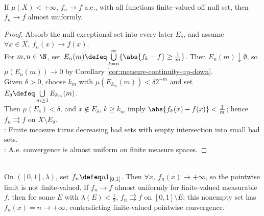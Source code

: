 \begin{theorem} \label{thm:egoroff-finite-measure} \\
If $\mu(X)<+\infty$, $f_n\to f$ a.e., with all functions finite-valued off null set, then $f_n\to f$ almost uniformly.
\begin{proof}
Absorb the null exceptional set into every later $E_\delta$, and assume $\forall x\in X,\ f_n(x)\to f(x)$.\\
For $m,n\in\N$, set $E_n(m)\defeq\bigcup\limits_{k=n}^{\infty}\{\abs{f_k-f}\geq\frac{1}{m}\}$. Then $E_n(m)\downarrow\emptyset$, so $\mu(E_n(m))\to0$ by Corollary \ref{cor:measure-continuity-up-down}.\\
Given $\delta>0$, choose $k_m$ with $\mu(E_{k_m}(m))<\delta2^{-m}$ and set $E_\delta\defeq\bigcup\limits_{m\geq1}E_{k_m}(m)$.\\
Then $\mu(E_\delta)<\delta$, and $x\notin E_\delta$, $k\geq k_m$ imply $\abs{f_k(x)-f(x)}<\frac{1}{m}$; hence $f_n\rightrightarrows f$ on $X\setminus E_\delta$.\\
: Finite measure turns decreasing bad sets with empty intersection into small bad sets.\\
: A.e. convergence is almost uniform on finite measure spaces.
\end{proof}
\end{theorem}

\begin{example} \label{ex:egoroff-needs-finite-valued-limit} \\
On $([0,1],\lambda)$, set $f_n\defeq n\mathbf{1}_{[0,1]}$. Then $\forall x,\ f_n(x)\to+\infty$, so the pointwise limit is not finite-valued. If $f_n\to f$ almost uniformly for finite-valued measurable $f$, then for some $E$ with $\lambda(E)<\frac{1}{2}$, $f_n\rightrightarrows f$ on $[0,1]\setminus E$; this nonempty set has $f_n(x)=n\to+\infty$, contradicting finite-valued pointwise convergence.
\end{example}

